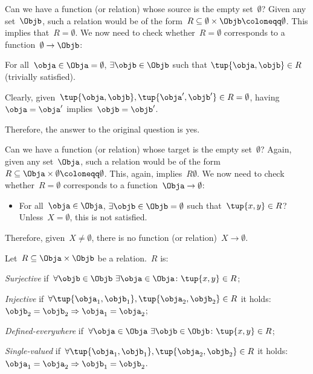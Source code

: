 \begin{example}
Can we have a function (or relation) whose source is the empty set~$\emptyset$? Given any set~$\Objb$, such a relation would be of the form~$R\subseteq \emptyset \times \Objb \coloneqq \emptyset$. This implies that~$R=\emptyset$. We now need to check whether~$R=\emptyset$ corresponds to a function~$\emptyset\to \Objb$:
\begin{compactitem}
    \item For all~$\obja\in \Obja=\emptyset$, $\exists \objb \in \Objb$ such that $\tup{\obja,\objb}\in R$ (trivially satisfied).
    \item Clearly, given~$\tup{\obja,\objb}, \tup{\obja',\objb'}\in R=\emptyset$, having~$\obja=\obja'$ implies~$\objb=\objb'$.
\end{compactitem}
Therefore, the answer to the original question is yes.
\end{example}

\begin{example}
 Can we have a function (or relation) whose target is the empty set~$\emptyset$? Again, given any set~$\Obja$, such a relation would be of the form~$R\subseteq \Obja\times \emptyset\coloneqq \emptyset$. This, again, implies~$R\emptyset$. We now need to check whether~$R=\emptyset$ corresponds to a function~$\Obja \to \emptyset$:
 \begin{itemize}
     \item For all~$\obja\in \Obja$, $\exists \objb\in \Objb=\emptyset$ such that~$\tup{x,y}\in R$? Unless~$X=\emptyset$, this is not satisfied.
 \end{itemize}
 Therefore, given~$X\neq \emptyset$, there is no function (or relation)~$X\to \emptyset$.
\end{example}

\begin{definition}
\label{def:rel_properties}
 Let~$R\subseteq \Obja \times \Objb$ be a relation.~$R$ is:
 \begin{compactenum}
   \item \emph{Surjective} if~$\forall \objb\in \Objb \ \exists \obja\in \Obja\colon \tup{x,y}\in R$;
   \item \emph{Injective} if~$\forall \tup{\obja_1,\objb_1},\tup{\obja_2,\objb_2}\in R$ it holds:~$\objb_2=\objb_2 \Rightarrow \obja_1=\obja_2$;
   \item \emph{Defined-everywhere} if~$\forall \obja\in \Obja \ \exists \objb \in \Objb\colon \tup{x,y}\in R$;
   \item \emph{Single-valued} if~$\forall \tup{\obja_1,\objb_1},\tup{\obja_2,\objb_2}\in R$ it holds:~$\obja_1=\obja_2\Rightarrow \objb_1=\objb_2$.
 \end{compactenum}
\end{definition}

